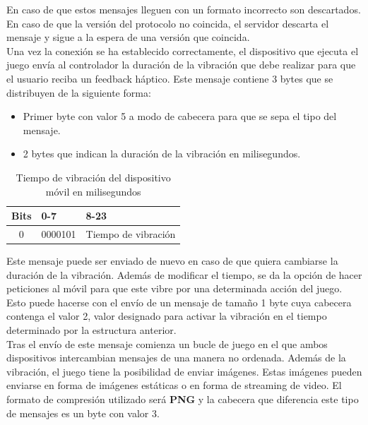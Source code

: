 En caso de que estos mensajes lleguen con un formato incorrecto son descartados. En caso de que la versi\'on del protocolo no coincida, el servidor descarta el mensaje y sigue a la espera de una versi\'on que coincida.\\

Una vez la conexi\'on se ha establecido correctamente, el dispositivo que ejecuta el juego env\'ia al controlador la duraci\'on de la vibraci\'on que debe realizar para que el usuario reciba un feedback h\'aptico. Este mensaje contiene 3 bytes que se distribuyen de la siguiente forma:

\begin {itemize}
\item Primer byte con valor 5 a modo de cabecera para que se sepa el tipo del mensaje.
\item 2 bytes que indican la duraci\'on de la vibraci\'on en milisegundos.
\end {itemize}

\begin{table}[h!]
\centering
\begin{tabular}{|l|l|l|} 
\hline
Bits                    & 0-7                   & 8-23                   \\
\hline
\multicolumn{1}{|c|}{0} & \multicolumn{1}{c|}{0000101} & \multicolumn{1}{c|}{Tiempo de vibraci\'on}  \\
\hline
\end{tabular}
\caption{Tiempo de vibraci\'on del dispositivo m\'ovil en milisegundos}
\label{table:2}
\end{table}

Este mensaje puede ser enviado de nuevo en caso de que quiera cambiarse la duraci\'on de la vibraci\'on. Adem\'as de modificar el tiempo, se da la opci\'on de hacer peticiones al m\'ovil para que este vibre por una determinada acci\'on del juego. Esto puede hacerse con el env\'io de un mensaje de tama\~no 1 byte cuya cabecera contenga el valor 2, valor designado para activar la vibraci\'on en el tiempo determinado por la estructura anterior.\\

Tras el env\'io de este mensaje comienza un bucle de juego en el que ambos dispositivos intercambian mensajes de una manera no ordenada. Adem\'as de la vibraci\'on, el juego tiene la posibilidad de enviar im\'agenes. Estas im\'agenes pueden enviarse en forma de im\'agenes est\'aticas o en forma de streaming de video. El formato de compresi\'on utilizado ser\'a \textbf{PNG} y la cabecera que diferencia este tipo de mensajes es un byte con valor 3.

